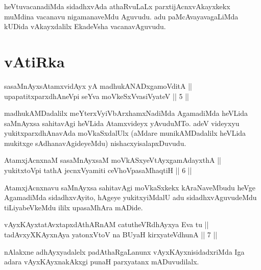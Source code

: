\begin{artha}
heVtuvacanadiMda sidadhxvAda athaRvuLaLx parxtijAcnxvAkayxkekx muMdina vacanavu nigamanaveMdu Aguvudu. adu paMcAvayavagaLiMda kUDida vAkayxdalilx EkadeVsha vacanavAguvudu.
\end{artha}

\section*{vAtiRka}


\begin{shl}
sasaMnAyxsA\s \s tamxvidAyx yA madhukANADxgamoVditA ||  \\
upapatitxparxdhAneV\s pi seYva moVkeSxV\s vasiVyateV ||  5 ||  
\end{shl}

\begin{artha}
madhukAMDadalilx meYterxVyiVbArxhamxNadiMda AgamadiMda heVLida saMnAyxsa sahitavAgi heVLida Atamxvideyx yAvuduMTo. adeV videyxyu yukitxparxdhAnavAda moVkaSxdalUlx (aMdare munikAMDadalilx heVLida mukitxge sAdhanavAgideyeMdu) nishacxyisalapxDuvudu. 
\end{artha}


\begin{shl}
AtamxjAcnxnaM sasaMnAyxsaM moVkASxyeVtAyxgamAdayxthA || \\
yukitxtoV\s pi tathA jecnxVyamiti ceVhoVpasaMhaqtiH ||  6 ||  
\end{shl}

\begin{artha}
AtamxjAcnxnavu saMnAyxsa sahitavAgi moVkaSxkekx kAraNaveMbudu heVge AgamadiMda sidadhxvAyito, hAgeye yukitxyiMdalU adu sidadhxvAguvudeMdu tiLiyabeVkeMdu ililx upasaMhAra mADide.
\end{artha}

\begin{shl}
vAyxKAyxtatAvxtapxdAthARnAM catutheVR\s dhAyxya Eva tu || \\
tadAvxyXKAyxnAya yatonxV\s toV na BUyaH kirxyateV\s dhunA ||  7 ||  
\end{shl}	

\begin{artha}
nAlakxne adhAyxyadalelx padAthaRgaLanunx vAyxKAyxnisidadxriMda Iga adara vAyxKAyxnakAkxgi punaH parxyatanx mADuvudilalx.
\end{artha}

